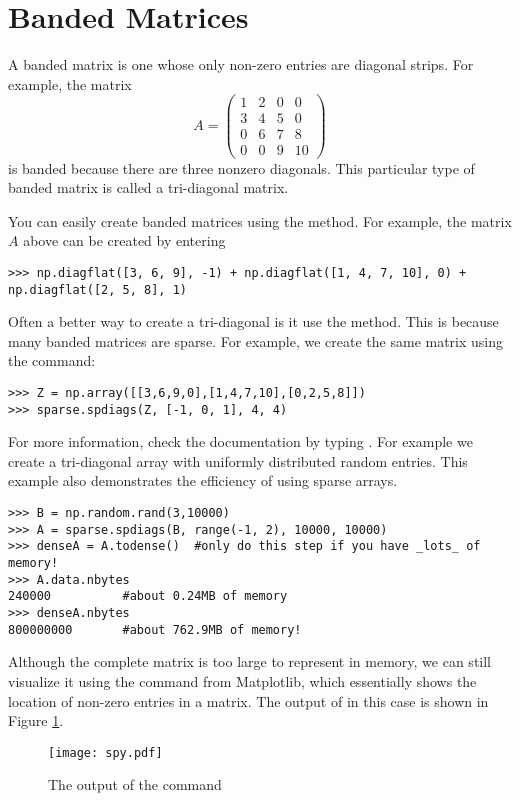 
\section*{Banded Matrices}
A banded matrix is one whose only non-zero entries are diagonal
strips.  For example, the matrix
\begin{equation*}
A = \begin{pmatrix}
1 & 2 & 0 & 0 \\
3 & 4 & 5 & 0 \\
0 & 6 & 7 & 8 \\
0 & 0 & 9 & 10
\end{pmatrix}
\end{equation*}
is banded because there are three nonzero diagonals.  This
particular type of banded matrix is called a tri-diagonal matrix.

You can easily create banded matrices using the  method.
For example, the matrix $A$ above can be created by entering
\begin{lstlisting}
>>> np.diagflat([3, 6, 9], -1) + np.diagflat([1, 4, 7, 10], 0) + np.diagflat([2, 5, 8], 1)
\end{lstlisting}

Often a better way to create a tri-diagonal is it use the  method.
This is because many banded matrices are sparse.
For example, we create the same matrix using the command:
\begin{lstlisting}
>>> Z = np.array([[3,6,9,0],[1,4,7,10],[0,2,5,8]])
>>> sparse.spdiags(Z, [-1, 0, 1], 4, 4)
\end{lstlisting}

For more information, check the documentation by typing .
For example we create a tri-diagonal array with uniformly distributed random entries.
This example also demonstrates the efficiency of using sparse arrays.
\begin{lstlisting}
>>> B = np.random.rand(3,10000)
>>> A = sparse.spdiags(B, range(-1, 2), 10000, 10000)
>>> denseA = A.todense()  #only do this step if you have _lots_ of memory!
>>> A.data.nbytes
240000          #about 0.24MB of memory
>>> denseA.nbytes
800000000       #about 762.9MB of memory!
\end{lstlisting}
Although the complete matrix is too large to represent in memory,
we can still visualize it using the  command from Matplotlib,
which essentially shows the location of non-zero entries in a matrix.
The output of  in this case is shown in Figure \ref{fig:mpl_spy}.
\begin{figure}[h]
\centering
\texttt{[image: spy.pdf]}
\caption{The output of the  command}
\label{fig:mpl_spy}
\end{figure}

